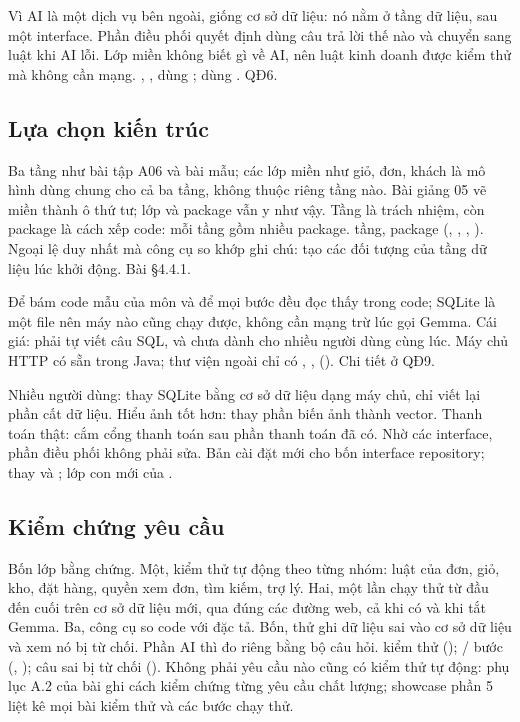{Vì AI là một dịch vụ bên ngoài, giống cơ sở dữ liệu: nó nằm ở tầng dữ liệu, sau một interface. Phần điều phối quyết định dùng câu trả lời thế nào và chuyển sang luật khi AI lỗi. Lớp miền không biết gì về AI, nên luật kinh doanh được kiểm thử mà không cần mạng.}
{, ,  dùng ;  dùng . QĐ6.}

\subsection{Lựa chọn kiến trúc}
{Ba tầng như bài tập A06 và bài mẫu; các lớp miền như giỏ, đơn, khách là mô hình dùng chung cho cả ba tầng, không thuộc riêng tầng nào. Bài giảng 05 vẽ miền thành ô thứ tư; lớp và package vẫn y như vậy. Tầng là trách nhiệm, còn package là cách xếp code: mỗi tầng gồm nhiều package.}
{\factLayers{} tầng, \factPackages{} package (, , , ). Ngoại lệ duy nhất mà công cụ so khớp ghi chú:  tạo các đối tượng của tầng dữ liệu lúc khởi động. Bài §4.4.1.}

{Để bám code mẫu của môn và để mọi bước đều đọc thấy trong code; SQLite là một file nên máy nào cũng chạy được, không cần mạng trừ lúc gọi Gemma. Cái giá: phải tự viết câu SQL, và chưa dành cho nhiều người dùng cùng lúc.}
{Máy chủ HTTP có sẵn trong Java; thư viện ngoài chỉ có , ,  (). Chi tiết ở QĐ9.}

{Nhiều người dùng: thay SQLite bằng cơ sở dữ liệu dạng máy chủ, chỉ viết lại phần cất dữ liệu. Hiểu ảnh tốt hơn: thay phần biến ảnh thành vector. Thanh toán thật: cắm cổng thanh toán sau phần thanh toán đã có. Nhờ các interface, phần điều phối không phải sửa.}
{Bản cài đặt mới cho bốn interface repository; thay  và ; lớp con mới của .}

\subsection{Kiểm chứng yêu cầu}
{Bốn lớp bằng chứng. Một, kiểm thử tự động theo từng nhóm: luật của đơn, giỏ, kho, đặt hàng, quyền xem đơn, tìm kiếm, trợ lý. Hai, một lần chạy thử từ đầu đến cuối trên cơ sở dữ liệu mới, qua đúng các đường web, cả khi có và khi tắt Gemma. Ba, công cụ so code với đặc tả. Bốn, thử ghi dữ liệu sai vào cơ sở dữ liệu và xem nó bị từ chối. Phần AI thì đo riêng bằng bộ câu hỏi.}
{\factTests{} kiểm thử (); \factEtoE{}/\factEtoE{} bước (, ); \factSqlRejected{} câu sai bị từ chối (). Không phải yêu cầu nào cũng có kiểm thử tự động: phụ lục A.2 của bài ghi cách kiểm chứng từng yêu cầu chất lượng; showcase phần 5 liệt kê mọi bài kiểm thử và các bước chạy thử.}

